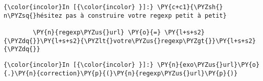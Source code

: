     \begin{Verbatim}[commandchars=\\\{\}]
{\color{incolor}In [{\color{incolor} }]:} \PY{c+c1}{\PYZsh{} n\PYZsq{}hésitez pas à construire votre regexp petit à petit}
        
        \PY{n}{regexp\PYZus{}url} \PY{o}{=} \PY{l+s+s2}{\PYZdq{}}\PY{l+s+s2}{\PYZlt{}votre\PYZus{}regexp\PYZgt{}}\PY{l+s+s2}{\PYZdq{}}
\end{Verbatim}


    \begin{Verbatim}[commandchars=\\\{\}]
{\color{incolor}In [{\color{incolor} }]:} \PY{n}{exo\PYZus{}url}\PY{o}{.}\PY{n}{correction}\PY{p}{(}\PY{n}{regexp\PYZus{}url}\PY{p}{)}
\end{Verbatim}